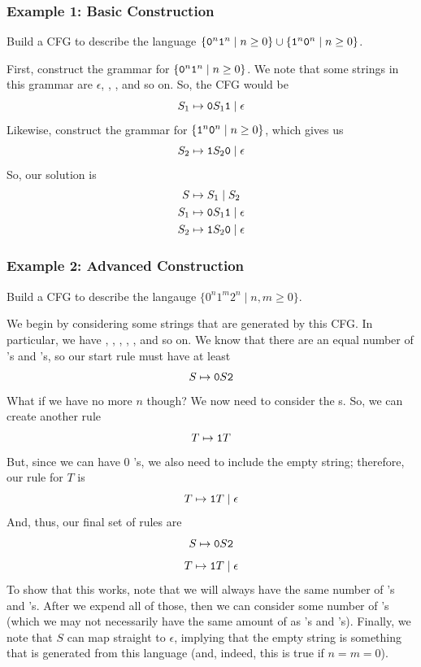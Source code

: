 \documentclass[letterpaper]{article}
\begin{document}
\subsubsection{Example 1: Basic Construction}
Build a CFG to describe the language $\{\texttt{0}^n \texttt{1}^n \mid n \geq 0\} \cup \{\texttt{1}^n \texttt{0}^n \mid n \geq 0\}$. 

\begin{mdframed}[]
    First, construct the grammar for $\{\texttt{0}^n \texttt{1}^n \mid n \geq 0\}$. We note that some strings in this grammar are $\epsilon$, , , and so on. So, the CFG would be  
    \[S_1 \mapsto \texttt{0}S_1 \texttt{1} \mid \epsilon\]
    Likewise, construct the grammar for $\{\texttt{1}^n \texttt{0}^n \mid n \geq 0\}$, which gives us 
    \[S_2 \mapsto \texttt{1}S_2 \texttt{0} \mid \epsilon\]
    So, our solution is 
    \begin{equation*}
        \begin{aligned}
            S &\mapsto S_1 \mid S_2 \\ 
            S_1 &\mapsto \texttt{0}S_1 \texttt{1} \mid \epsilon \\ 
            S_2 &\mapsto \texttt{1}S_2 \texttt{0} \mid \epsilon
        \end{aligned}
    \end{equation*}
\end{mdframed}

\subsubsection{Example 2: Advanced Construction}
Build a CFG to describe the langauge $\{0^n 1^m 2^n \mid n, m \geq 0\}$.

\begin{mdframed}[]
    We begin by considering some strings that are generated by this CFG. In particular, we have , , , , , and so on. We know that there are an equal number of 's and 's, so our start rule must have at least 
    \[S \mapsto \texttt{0}S\texttt{2}\]
    What if we have no more $n$ though? We now need to consider the s. So, we can create another rule 
    \[T \mapsto \texttt{1}T\] 
    But, since we can have 0 's, we also need to include the empty string; therefore, our rule for $T$ is 
    \[T \mapsto \texttt{1}T \mid \epsilon\]
    And, thus, our final set of rules are 
    \[S \mapsto \texttt{0}S\texttt{2}\]
    \[T \mapsto \texttt{1}T \mid \epsilon\]
    To show that this works, note that we will always have the same number of 's and 's. After we expend all of those, then we can consider some number of 's (which we may not necessarily have the same amount of as 's and 's). Finally, we note that $S$ can map straight to $\epsilon$, implying that the empty string is something that is generated from this language (and, indeed, this is true if $n = m = 0$).
\end{mdframed}
\end{document}
